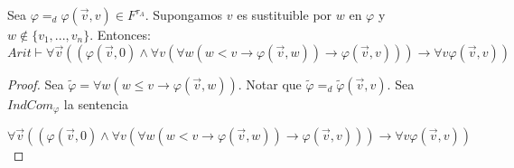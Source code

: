   \begin{lemma}
    Sea \(\varphi =_{d}\varphi (\vec{v},v)\in F^{\tau _{A}}\). Supongamos \(v\) es sustituible por \(w\) en \(\varphi \) y \(w\notin \{v_{1},...,v_{n}\}.\) Entonces:
    \(\displaystyle Arit\vdash \forall \vec{v}((\varphi (\vec{v},0)\wedge \forall v(\forall w(w< v\rightarrow \varphi (\vec{v},w))\rightarrow \varphi (\vec{v} ,v)))\rightarrow \forall v\varphi (\vec{v},v)) \)
  \end{lemma}
  \begin{proof}
    Sea \(\tilde{\varphi}=\forall w(w\leq v\rightarrow \varphi (\vec{v},w))\). Notar que \(\tilde{\varphi}=_{d}\tilde{\varphi}(\vec{v},v)\). Sea \( IndCom_{\varphi }\) la sentencia

    \(\displaystyle \forall \vec{v}((\varphi (\vec{v},0)\wedge \forall v(\forall w(w< v\rightarrow \varphi (\vec{v},w))\rightarrow \varphi (\vec{v} ,v)))\rightarrow \forall v\varphi (\vec{v},v)) \)


\end{proof}
